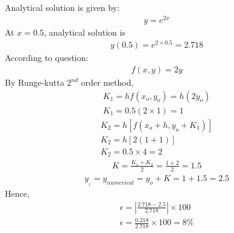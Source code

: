 \documentclass[journal,12pt,twocolumn]{IEEEtran}
\theoremstyle{remark}
\begin{document}
Analytical solution is given by:
\begin{align}
    y = e^{2x}
\end{align}
At $x = 0.5$, analytical solution is 
\begin{align}
    y(0.5) = e^{2\times 0.5} = 2.718 
\end{align}
According to question:
\begin{align}
    f(x,y) = 2y
\end{align}
By Runge-kutta $2^{nd}$ order method, 
\begin{align}
    K_1 = hf(x_o,y_o) = h(2y_o)\\
    K_1 = 0.5(2 \times 1) = 1
\end{align}
\begin{align}
    K_2 = h[f(x_o + h, y_o + K_1)]\\
    K_2 = h[2(1 +1)]\\
    K_2 = 0.5 \times 4 = 2 
\end{align}
\begin{align}
    K = \frac{K_1 + K_2}{2} = \frac{1 +2}{2} = 1.5
\end{align}
\begin{align}
    y_{_{1}} = y_{numerical} = y_o + K = 1 + 1.5 = 2.5 
\end{align}
Hence, 
\begin{align}
    \epsilon = \left|\frac{2.718 - 2.5}{2.718}\right| \times 100 \\
    \epsilon = \frac{0.218}{2.718}\times 100 = 8\%
 \end{align}


\end{document}
